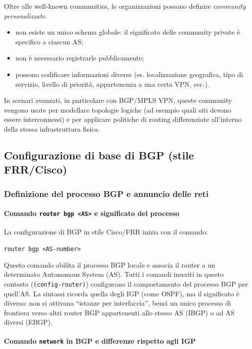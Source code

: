 Oltre alle well-known communities, le organizzazioni possono definire \emph{community personalizzate}.
\begin{itemize}
    \item non esiste un unico schema globale: il significato delle community private è specifico a ciascun AS;
    \item non è necessario registrarle pubblicamente;
    \item possono codificare informazioni diverse (es. localizzazione geografica, tipo di servizio, livello di priorità, appartenenza a una certa VPN, ecc.).
\end{itemize}

In scenari avanzati, in particolare con BGP/MPLS VPN, queste community vengono usate per modellare topologie logiche (ad esempio quali siti devono essere interconnessi) e per applicare politiche di routing differenziate all’interno della stessa infrastruttura fisica.

\subsection{Configurazione di base di BGP (stile FRR/Cisco)}

\subsubsection{Definizione del processo BGP e annuncio delle reti}

\paragraph{Comando \texttt{router bgp <AS>} e significato del processo}

La configurazione di BGP in stile Cisco/FRR inizia con il comando:
\begin{center}
    \texttt{router bgp <AS-number>}
\end{center}
Questo comando abilita il processo BGP locale e associa il router a un determinato Autonomous System (AS). Tutti i comandi inseriti in questo contesto (\texttt{(config-router)}) configurano il comportamento del processo BGP per quell’AS. La sintassi ricorda quella degli IGP (come OSPF), ma il significato è diverso: non si attivano “istanze per interfaccia”, bensì un unico processo di frontiera verso altri router BGP appartenenti allo stesso AS (IBGP) o ad AS diversi (EBGP).

\paragraph{Comando \texttt{network} in BGP e differenze rispetto agli IGP}

